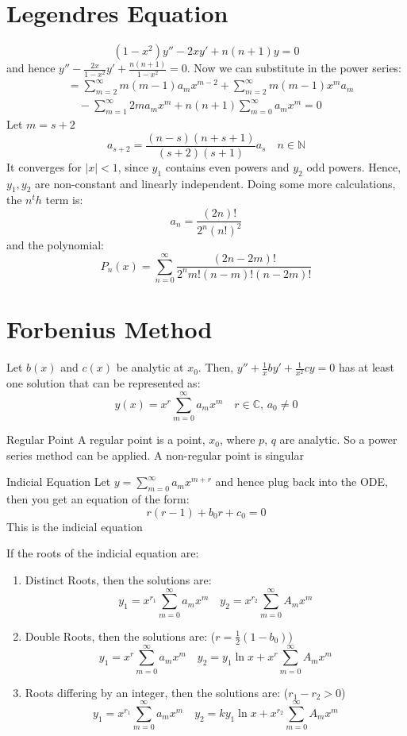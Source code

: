 \documentclass{article}
\newcommand{\N}{\mathbb{N}}
\newcommand{\C}{\mathbb{C}}
\begin{document}
\section{Legendres Equation}
$$ (1 - x^2)y'' - 2xy' + n(n+1)y = 0 $$
and hence $\displaystyle{y'' - \frac{2x}{1 - x^2}y' + \frac{n(n+1)}{1 - x^2} = 0}$. Now we can substitute in the power series:
\begin{align*}
  &= \sum_{m = 2}^\infty {m(m - 1)a_mx^{m-2}} + \sum_{m = 2}^\infty {m(m - 1)x^{m}a_m} \\
  &\quad - \sum_{m=1}^\infty{2ma_mx^m} + n(n+1)\sum_{m=0}^\infty{a_mx^m} = 0
\end{align*}
Let $m = s + 2$
$$ a_{s+2} = \frac{(n - s)(n + s + 1)}{(s + 2)(s + 1)}a_s \quad n\in\N$$
It converges for $|x| < 1$, since $y_1$ contains even powers and $y_2$ odd powers. Hence, $y_1, y_2$ are non-constant and linearly independent. Doing some more calculations, the $n^th$ term is:
$$ a_n = \frac{(2n)!}{2^n(n!)^2} $$
and the polynomial:
$$ P_n(x) = \sum_{n=0}^\infty{\frac{(2n - 2m)!}{2^nm!(n-m)!(n - 2m)!}} $$

\section{Forbenius Method}
\noindent\begin{theorem}{}{}
   Let $b(x)$ and $c(x)$ be analytic at $x_0$. Then, $\displaystyle{y'' + \frac{1}{x}by' + \frac{1}{x^2}cy = 0}$ has at least one solution that can be represented as:
   $$ y(x) = x^r\sum^\infty_{m = 0}{a_mx^m} \quad r\in\C,\, a_0 \neq 0$$
\end{theorem}\vspace{10pt}

\noindent\begin{definition}{Regular Point}{}
  A regular point is a point, $x_0$, where $p$, $q$ are analytic. So a power series method can be applied. A non-regular point is singular
\end{definition}\vspace{10pt}

\noindent\begin{definition}{Indicial Equation}{}
  Let $y = \sum_{m=0}^\infty{a_mx^{m+r}}$ and hence plug back into the ODE, then you get an equation of the form:
  $$ r(r-1) + b_0r + c_0 = 0 $$
  This is the indicial equation
\end{definition}\vspace{10pt}

If the roots of the indicial equation are:
\begin{enumerate}
  \item Distinct Roots, then the solutions are:
    $$ y_1 = x^{r_1}\sum_{m=0}^\infty {a_mx^m} \quad y_2 = x^{r_2}\sum_{m=0}^\infty{A_mx^m}$$
  \item Double Roots, then the solutions are: ($r = \frac{1}{2}(1 - b_0)$)
  $$ y_1 = x^{r}\sum_{m=0}^\infty {a_mx^m} \quad y_2 = y_1\ln{x} + x^{r}\sum_{m=0}^\infty{A_mx^m}$$
  \item Roots differing by an integer, then the solutions are: ($r_1 - r_2 > 0$)
    $$ y_1 = x^{r_1}\sum_{m=0}^\infty {a_mx^m} \quad y_2 = ky_1\ln{x} + x^{r_2}\sum_{m=0}^\infty{A_mx^m}$$
\end{enumerate}
\end{document}
